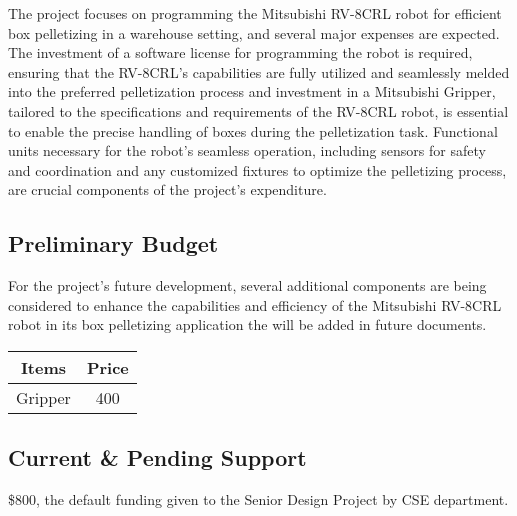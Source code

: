 The project focuses on programming the Mitsubishi RV-8CRL robot for efficient box pelletizing in a warehouse setting, and several major expenses are expected. The investment of a software license for programming the robot is required, ensuring that the RV-8CRL's capabilities are fully utilized and seamlessly melded into the preferred pelletization process and investment in a Mitsubishi Gripper, tailored to the specifications and requirements of the RV-8CRL robot, is essential to enable the precise handling of boxes during the pelletization task. Functional units necessary for the robot's seamless operation, including sensors for safety and coordination and any customized fixtures to optimize the pelletizing process, are crucial components of the project's expenditure. 

\subsection{Preliminary Budget}

For the project's future development, several additional components are being considered to enhance the capabilities and efficiency of the Mitsubishi RV-8CRL robot in its box pelletizing application the will be added in future documents.

\begin{table}[h]
    \centering
    \begin{tabular}{|c|c|} \hline 
         Items& Price\\ \hline 
         Gripper& 400\\ \hline
    \end{tabular}
\end{table}


\subsection{Current \& Pending Support}

\$800, the default funding given to  the Senior Design Project by CSE department.